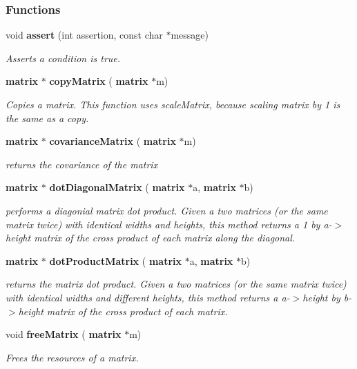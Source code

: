 \subsubsection*{Functions}
\begin{DoxyCompactItemize}
\item 
void \textbf{ assert} (int assertion, const char $\ast$message)
\begin{DoxyCompactList}\small\item\em Asserts a condition is true. \end{DoxyCompactList}\item 
\textbf{ matrix} $\ast$ \textbf{ copy\+Matrix} (\textbf{ matrix} $\ast$m)
\begin{DoxyCompactList}\small\item\em Copies a matrix. This function uses scale\+Matrix, because scaling matrix by 1 is the same as a copy. \end{DoxyCompactList}\item 
\textbf{ matrix} $\ast$ \textbf{ covariance\+Matrix} (\textbf{ matrix} $\ast$m)
\begin{DoxyCompactList}\small\item\em returns the covariance of the matrix \end{DoxyCompactList}\item 
\textbf{ matrix} $\ast$ \textbf{ dot\+Diagonal\+Matrix} (\textbf{ matrix} $\ast$a, \textbf{ matrix} $\ast$b)
\begin{DoxyCompactList}\small\item\em performs a diagonial matrix dot product. Given a two matrices (or the same matrix twice) with identical widths and heights, this method returns a 1 by a-\/$>$height matrix of the cross product of each matrix along the diagonal. \end{DoxyCompactList}\item 
\textbf{ matrix} $\ast$ \textbf{ dot\+Product\+Matrix} (\textbf{ matrix} $\ast$a, \textbf{ matrix} $\ast$b)
\begin{DoxyCompactList}\small\item\em returns the matrix dot product. Given a two matrices (or the same matrix twice) with identical widths and different heights, this method returns a a-\/$>$height by b-\/$>$height matrix of the cross product of each matrix. \end{DoxyCompactList}\item 
void \textbf{ free\+Matrix} (\textbf{ matrix} $\ast$m)
\begin{DoxyCompactList}\small\item\em Frees the resources of a matrix. \end{DoxyCompactList}\item 

\end{DoxyCompactItemize}
